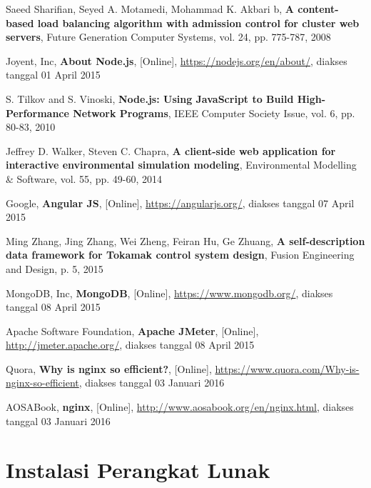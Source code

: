 \documentclass{ta-its}
\begin{document}
		
			\begin{thebibliography}{9}
					Saeed Sharifian, Seyed A. Motamedi, Mohammad K. Akbari b,
					\textbf{A content-based load balancing algorithm with admission control for cluster web servers},
					Future Generation Computer Systems,
					vol. 24, pp. 775-787, 2008
				
					Joyent, Inc,
					\textbf{About Node.js}, [Online],
					\url{https://nodejs.org/en/about/},
					diakses tanggal 01 April 2015
					
					S. Tilkov and S. Vinoski,
					\textbf{Node.js: Using JavaScript to Build High-Performance Network Programs},
					IEEE Computer Society Issue,
					vol. 6, pp. 80-83, 2010
					
					Jeffrey D. Walker, Steven C. Chapra,
					\textbf{A client-side web application for interactive environmental simulation modeling},
					Environmental Modelling \& Software,
					vol. 55, pp. 49-60, 2014
				
					Google,
					\textbf{Angular JS}, [Online],
					\url{https://angularjs.org/},
					diakses tanggal 07 April 2015
				
					Ming Zhang, Jing Zhang, Wei Zheng, Feiran Hu, Ge Zhuang,
					\textbf{A self-description data framework for Tokamak control system design},
					Fusion Engineering and Design,
					p. 5, 2015
				
					MongoDB, Inc,
					\textbf{MongoDB}, [Online],
					\url{https://www.mongodb.org/},
					diakses tanggal 08 April 2015
					
					Apache Software Foundation,
					\textbf{Apache JMeter}, [Online],
					\url{http://jmeter.apache.org/},
					diakses tanggal 08 April 2015
				
					Quora,
					\textbf{Why is nginx so efficient?}, [Online],
					\url{https://www.quora.com/Why-is-nginx-so-efficient},
					diakses tanggal 03 Januari 2016
				
					AOSABook,
					\textbf{nginx}, [Online],
					\url{http://www.aosabook.org/en/nginx.html},
					diakses tanggal 03 Januari 2016
			\end{thebibliography}

\renewcommand\chaptername{LAMPIRAN}
\appendix %
	\chapter{Instalasi Perangkat Lunak}
\end{document}
